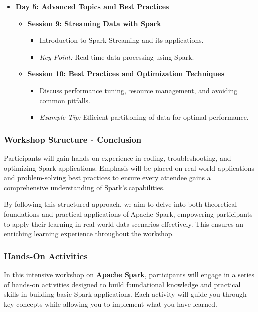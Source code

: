 \documentclass[aspectratio=169]{beamer}
\begin{document}
\begin{frame}[fragile]
\begin{itemize}
        \item \textbf{Day 5: Advanced Topics and Best Practices}
        \begin{itemize}
            \item \textbf{Session 9: Streaming Data with Spark}
            \begin{itemize}
                \item Introduction to Spark Streaming and its applications.
                \item \textit{Key Point:} Real-time data processing using Spark.
            \end{itemize}
            \item \textbf{Session 10: Best Practices and Optimization Techniques}
            \begin{itemize}
                \item Discuss performance tuning, resource management, and avoiding common pitfalls.
                \item \textit{Example Tip:} Efficient partitioning of data for optimal performance.
            \end{itemize}
        \end{itemize}
    \end{itemize}
\end{frame}

\begin{frame}[fragile]
    \frametitle{Workshop Structure - Conclusion}
    Participants will gain hands-on experience in coding, troubleshooting, and optimizing Spark applications. Emphasis will be placed on real-world applications and problem-solving best practices to ensure every attendee gains a comprehensive understanding of Spark's capabilities.

    By following this structured approach, we aim to delve into both theoretical foundations and practical applications of Apache Spark, empowering participants to apply their learning in real-world data scenarios effectively. This ensures an enriching learning experience throughout the workshop.
\end{frame}

\begin{frame}[fragile]
    \frametitle{Hands-On Activities}
    In this intensive workshop on \textbf{Apache Spark}, participants will engage in a series of hands-on activities designed to build foundational knowledge and practical skills in building basic Spark applications. 
    Each activity will guide you through key concepts while allowing you to implement what you have learned.
\end{frame}
\end{document}

